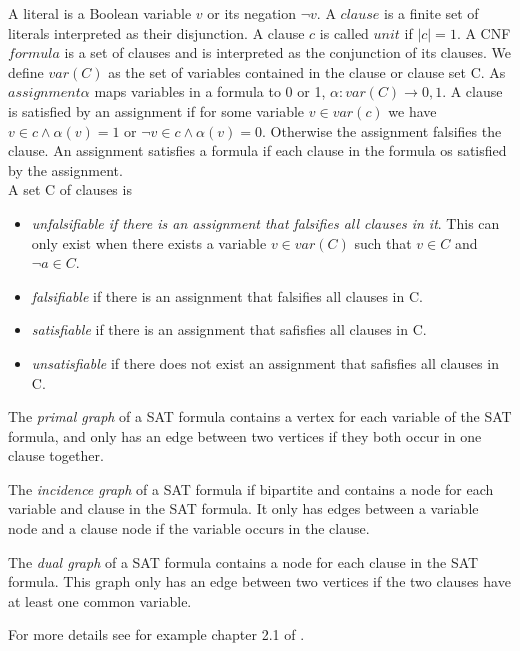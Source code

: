 \documentclass[a4paper, 12pt, bibliography=totoc]{scrartcl}
\begin{document}
A literal is a Boolean variable $v$ or its negation $\neg v$. A $clause$ is a finite set of literals interpreted as their disjunction. A clause $c$ is called $unit$ if $|c|=1$. A CNF $formula$ is a set of clauses and is interpreted as the conjunction of its clauses. We define $var(C)$ as the set of variables contained in the clause or clause set C. As $assignment \alpha$ maps variables in a formula to 0 or 1, $\alpha : var(C)\rightarrow 0,1$. A clause is satisfied by an assignment if for some variable $v \in var(c)$ we have $v \in c \land \alpha (v)=1$ {or} $\neg v \in c \land \alpha(v)=0$. Otherwise the assignment falsifies the clause. An assignment satisfies a formula if each clause in the formula os satisfied by the assignment. \\
A set C of clauses is 
\begin{itemize}
	\renewcommand{\labelitemi}{-}
	\item \textit{unfalsifiable if there is an assignment that falsifies all clauses in it}. This can only exist when there exists a variable $v \in var(C)$ such that $v \in C$ and $\neg a \in C$. 
	\item \textit{falsifiable} if there is an assignment that falsifies all clauses in C.
	\item \textit{satisfiable} if there is an assignment that safisfies all clauses in C.
	\item \textit{unsatisfiable} if there does not exist an assignment that safisfies all clauses in C.
\end{itemize}

The \textit{primal graph} of a SAT formula contains a vertex for each variable of the SAT formula, and only has an edge between two vertices if they both occur in one clause together.

The \textit{incidence graph} of a SAT formula if bipartite and contains a node for each variable and clause in the SAT formula. It only has edges between a variable node and a clause node if the variable occurs in the clause.

The \textit{dual graph} of a SAT formula contains a node for each clause in the SAT formula. This graph only has an edge between two vertices if the two clauses have at least one common variable.

For more details see for example chapter 2.1 of \cite{DiplomarbeitZisser}.

\end{document}
